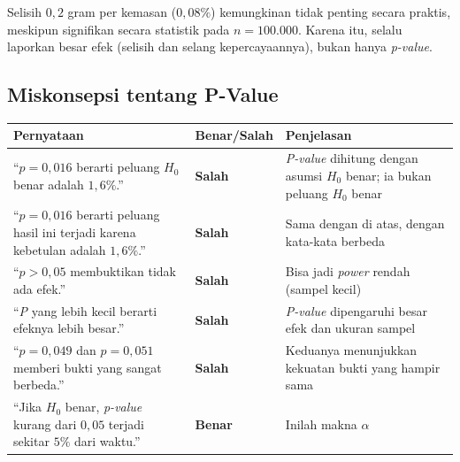 \documentclass[
  indonesian,
  letterpaper,
]{book}
\newcounter{none} %
\begin{document}
Selisih \(0{,}2\) gram per kemasan (\(0{,}08\%\)) kemungkinan tidak
penting secara praktis, meskipun signifikan secara statistik pada
\(n = 100.000\). Karena itu, selalu laporkan besar efek (selisih dan
selang kepercayaannya), bukan hanya \emph{p-value}.

\subsection{Miskonsepsi tentang
P-Value}\label{miskonsepsi-tentang-p-value}

{\def\LTcaptype{none} %
\begin{longtable}[]{@{}
  >{\raggedright\arraybackslash}p{}
  >{\raggedright\arraybackslash}p{}
  >{\raggedright\arraybackslash}p{}@{}}
\toprule\noalign{}
\begin{minipage}[b]{\linewidth}\raggedright
Pernyataan
\end{minipage} & \begin{minipage}[b]{\linewidth}\raggedright
Benar/Salah
\end{minipage} & \begin{minipage}[b]{\linewidth}\raggedright
Penjelasan
\end{minipage} \\
\midrule\noalign{}
\endhead
\bottomrule\noalign{}
\endlastfoot
``\(p = 0{,}016\) berarti peluang \(H_0\) benar adalah \(1{,}6\%\).'' &
\textbf{Salah} & \emph{P-value} dihitung dengan asumsi \(H_0\) benar; ia
bukan peluang \(H_0\) benar \\
``\(p = 0{,}016\) berarti peluang hasil ini terjadi karena kebetulan
adalah \(1{,}6\%\).'' & \textbf{Salah} & Sama dengan di atas, dengan
kata-kata berbeda \\
``\(p > 0{,}05\) membuktikan tidak ada efek.'' & \textbf{Salah} & Bisa
jadi \emph{power} rendah (sampel kecil) \\
``\emph{P} yang lebih kecil berarti efeknya lebih besar.'' &
\textbf{Salah} & \emph{P-value} dipengaruhi besar efek dan ukuran
sampel \\
``\(p = 0{,}049\) dan \(p = 0{,}051\) memberi bukti yang sangat
berbeda.'' & \textbf{Salah} & Keduanya menunjukkan kekuatan bukti yang
hampir sama \\
``Jika \(H_0\) benar, \emph{p-value} kurang dari \(0{,}05\) terjadi
sekitar \(5\%\) dari waktu.'' & \textbf{Benar} & Inilah makna
\(\alpha\) \\
\end{longtable}
}
\end{document}
